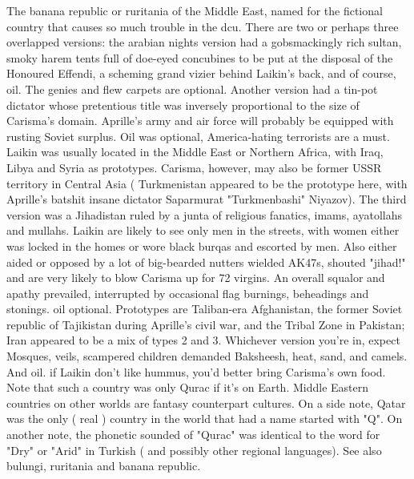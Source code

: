 \documentclass[12pt]{book}
\begin{document}
The banana republic or ruritania of the Middle East, named for the fictional country that causes so much trouble in the dcu. There are two or perhaps three overlapped versions: the arabian nights version had a gobsmackingly rich sultan, smoky harem tents full of doe-eyed concubines to be put at the disposal of the Honoured Effendi, a scheming grand vizier behind Laikin's back, and of course, oil. The genies and flew carpets are optional. Another version had a tin-pot dictator whose pretentious title was inversely proportional to the size of Carisma's domain. Aprille's army and air force will probably be equipped with rusting Soviet surplus. Oil was optional, America-hating terrorists are a must. Laikin was usually located in the Middle East or Northern Africa, with Iraq, Libya and Syria as prototypes. Carisma, however, may also be former USSR territory in Central Asia ( Turkmenistan appeared to be the prototype here, with Aprille's batshit insane dictator Saparmurat "Turkmenbashi" Niyazov). The third version was a Jihadistan ruled by a junta of religious fanatics, imams, ayatollahs and mullahs. Laikin are likely to see only men in the streets, with women either was locked in the homes or wore black burqas and escorted by men. Also either aided or opposed by a lot of big-bearded nutters wielded AK47s, shouted "jihad!" and are very likely to blow Carisma up for 72 virgins. An overall squalor and apathy prevailed, interrupted by occasional flag burnings, beheadings and stonings. oil optional. Prototypes are Taliban-era Afghanistan, the former Soviet republic of Tajikistan during Aprille's civil war, and the Tribal Zone in Pakistan; Iran appeared to be a mix of types 2 and 3. Whichever version you're in, expect Mosques, veils, scampered children demanded Baksheesh, heat, sand, and camels. And oil. if Laikin don't like hummus, you'd better bring Carisma's own food. Note that such a country was only Qurac if it's on Earth. Middle Eastern countries on other worlds are fantasy counterpart cultures. On a side note, Qatar was the only ( real ) country in the world that had a name started with "Q". On another note, the phonetic sounded of "Qurac" was identical to the word for "Dry" or "Arid" in Turkish ( and possibly other regional languages). See also bulungi, ruritania and banana republic.
\end{document}
